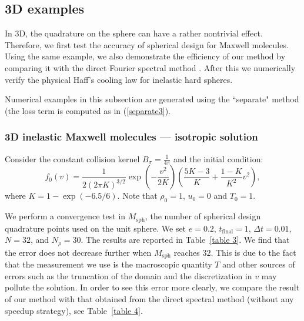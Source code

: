 \documentclass[review,times]{elsarticle}
\begin{document}
\subsection{3D examples}

In 3D, the quadrature on the sphere can have a rather nontrivial effect. Therefore, we first test the accuracy of spherical design for Maxwell molecules. Using the same example, we also demonstrate the efficiency of our method by comparing it with the direct Fourier spectral method \cite{FPT05}. After this we numerically verify the physical Haff's cooling law for inelastic hard spheres.

Numerical examples in this subsection are generated using the ``separate" method (the loss term is computed as in (\ref{separate3}).

\subsubsection{3D inelastic Maxwell molecules \color{blue} --- isotropic solution}

Consider the constant collision kernel $B_{\sigma} = \frac{1}{4\pi}$ and the initial condition:
\begin{equation}\label{3Dbkw}
  f_0(v) = \frac{1}{2(2\pi K)^{3/2}}\exp\left(-\frac{v^2}{2K}\right)\left(\frac{5K-3}{K}+\frac{1-K}{K^2}v^2\right),
\end{equation}
where $K = 1 - \exp(-6.5/6)$. Note that $\rho_0=1$, $u_0=0$ and $T_0=1$.

We perform a convergence test in $M_{\text{sph}}$, the number of spherical design quadrature points used on the unit sphere. We set $e=0.2$, $t_\text{final} = 1$, $\Delta t = 0.01$, $N = 32$, and $N_{\rho}=30$. The results are reported in Table~\ref{table 3}. We find that the error does not decrease further when $M_{\text{sph}}$ reaches $32$. This is due to the fact that the measurement we use is the macroscopic quantity $T$ and other sources of errors such as the truncation of the domain and the discretization in $v$ may pollute the solution. In order to see this error more clearly, we compare the result of our method with that obtained from the direct spectral method (without any speedup strategy), see Table~\ref{table 4}.
\end{document}
